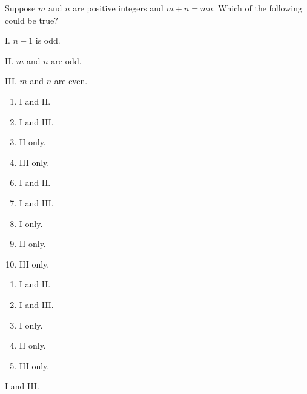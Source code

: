 Suppose $m$ and $n$ are positive integers and $m+n=mn$. Which of the following could be true?

\hspace{3cm}I. $n-1$ is odd.

\hspace{3cm}II. $m$ and $n$ are odd.

\hspace{3cm}III. $m$ and $n$ are even.



\ifsat
	\begin{enumerate}[label=\Alph*)]
		\item I and II.
		\item I and III.%
		\item II only.
		\item III only.
 
	\end{enumerate}
\else
\fi

\ifacteven
	\begin{enumerate}[label=\textbf{\Alph*.},itemsep=\fill,align=left]
		\setcounter{enumii}{5}
		\item I and II.
		\item I and III.%
		\item I only.
		\addtocounter{enumii}{1}
		\item II only.
		\item III only.
 
	\end{enumerate}
\else
\fi

\ifactodd
	\begin{enumerate}[label=\textbf{\Alph*.},itemsep=\fill,align=left]
		\item I and II.
		\item I and III.%
		\item I only.
		\item II only.
		\item III only.
 
	\end{enumerate}
\else
\fi

\ifgridin
 I and III.%
		
\else
\fi

